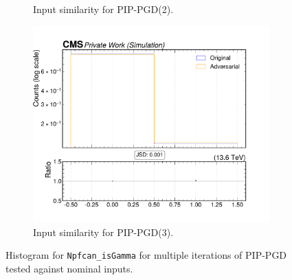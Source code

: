 \begin{figure}[htbp]
\begin{subfigure}[t]{0.32\textwidth}
    \caption*{Input similarity for PIP-PGD(2).}
  \end{subfigure}\hfill
  \begin{subfigure}[t]{0.32\textwidth}
    \includegraphics[width=\linewidth]{media/output/features/compare/combined_it_3/cmp_npf_arr_Npfcan_isGamma.pdf}
    \caption*{Input similarity for PIP-PGD(3).}
  \end{subfigure}

  \caption*{Histogram for \texttt{Npfcan\_isGamma} for multiple iterations of PIP-PGD tested against nominal inputs.}
  \label{fig:combined_input_Npfcan_isGamma}
\end{figure}

